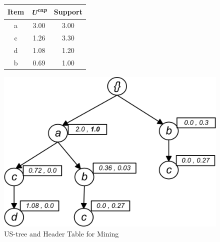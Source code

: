 \begin{figure}
\begin{minipage}{0.40\textwidth}
  \centering
  
	\begin{center}
	\begin{tabular}{ |c|c|c| } 
 	\hline
 		Item&\emph{U\textsuperscript{cap}}&Support\\ \hline\hline
 		a &  3.00  & 3.00\\ \hline
 		c &  1.26  & 3.30\\ \hline
 		d &  1.08  & 1.20\\ \hline
 		b &  0.69  & 1.00\\ \hline
\end{tabular}
\end{center}  
  
  
\end{minipage}
\hfill
\begin{minipage}{0.40\textwidth}
  \centering
  \includegraphics[width=\textwidth]{images/M_TREE.jpg}
\end{minipage}
\caption{US-tree and Header Table for Mining}
\label{figure:min_ready}
\end{figure}
%